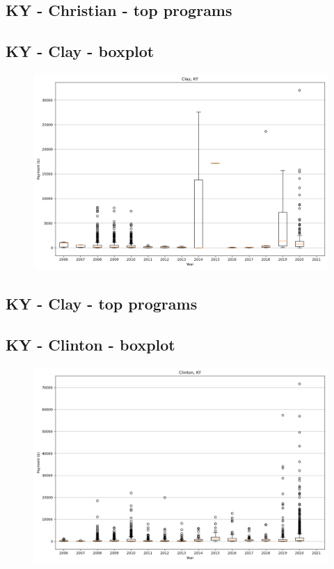 \subsection*{KY - Christian - top programs}

\newpage
\subsection*{KY - Clay - boxplot}
\begin{figure}[h]
\centering
\includegraphics[width=7in]{../output/boxplots/counties/Clay-KY_boxplot.png}
\end{figure}


\subsection*{KY - Clay - top programs}

\newpage
\subsection*{KY - Clinton - boxplot}
\begin{figure}[h]
\centering
\includegraphics[width=7in]{../output/boxplots/counties/Clinton-KY_boxplot.png}
\end{figure}


